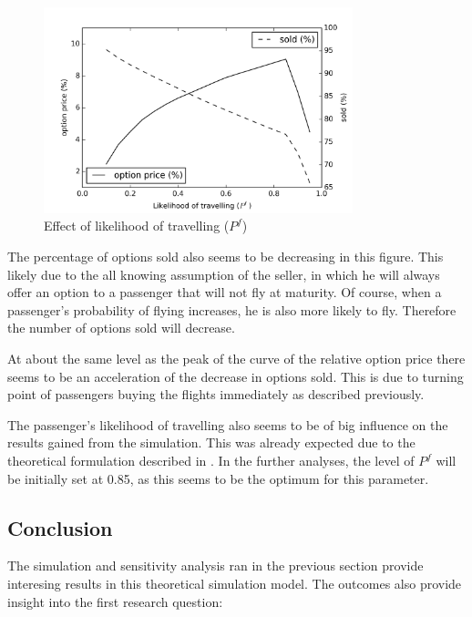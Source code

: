 \begin{figure}
    \centering
    \includegraphics[width=0.8\textwidth]{figures/OptionPrice_Pf.png}
    \caption{Effect of likelihood of travelling ($P^f$)}
    \label{fig:OptionPrice_Pf}
\end{figure}


The percentage of options sold also seems to be decreasing in this figure. This likely due to the all knowing assumption of the seller, in which he will always offer an option to a passenger that will not fly at maturity. Of course, when a passenger's probability of flying increases, he is also more likely to fly. Therefore the number of options sold will decrease.

At about the same level as the peak of the curve of the relative option price there seems to be an acceleration of the decrease in options sold. This is due to turning point of passengers buying the flights immediately as described previously.

The passenger's likelihood of travelling also seems to be of big influence on the results gained from the simulation. This was already expected due to the theoretical formulation described in . In the further analyses, the level of $P^f$ will be initially set at 0.85, as this seems to be the optimum for this parameter. 


\subsection{Conclusion}
The simulation and sensitivity analysis ran in the previous section provide interesing results in this theoretical simulation model. The outcomes also provide insight into the first research question:

